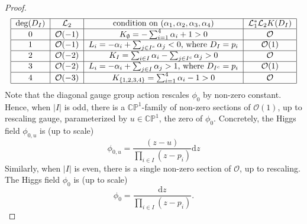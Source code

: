 \documentclass[12pt,letterpaper,reqno]{amsart}
\theoremstyle{remark}
\theoremstyle{definition}
\numberwithin{thm}{section}
\numberwithin{equation}{section}
\numberwithin{figure}{section}
\newcommand{\cL}{\ensuremath{\mathcal L}}
\newcommand{\cO}{\ensuremath{\mathcal O}}
\newcommand{\cE}{{\mathcal E}}
\newcommand{\de}{\mathrm{d}}
\begin{document}
\begin{proof}
\begin{equation}
\label{eq:tablefixedpoints}
        \begin{tabular}{|c|c|c|c|}\hline
                $\deg(D_I)$&$\cL_2$&condition on $(\alpha_1,\alpha_2,\alpha_3,\alpha_4)$& $\cL_1^* \cL_2 K(D_I)$\\\hline
                 $0$& $\cO(-1)$& $K_{\emptyset}= -\sum_{i=1}^4\alpha_i+1>0$&$\cO$ \\\hline 
                 $1$ &$\cO(-1)$& $L_i=-\alpha_i+\sum_{j\in I^c}\alpha_j<0$, where $D_I=p_i$& \cO(1)\\\hline
                 $2$ &$\cO(-2)$&$K_I = \sum_{i\in I}\alpha_i-\sum_{j\in I^c}\alpha_j>0$&$\cO$\\\hline
                 $3$&$\cO(-2)$& $L_i = -\alpha_i+\sum_{j\in I}\alpha_j>1$, where $D_{I^c}=p_i$&$\cO(1)$\\\hline
                 $4$&$\cO(-3)$& $K_{\{1,2,3,4\}}=\sum_{i=1}^4\alpha_i-1>0$&$\cO$\\\hline
        \end{tabular}
\end{equation}
Note that the diagonal gauge group action rescales $\phi_0$ by non-zero constant. Hence, when $|I|$ is odd, there is a $\mathbb{CP}^1$-family of non-zero sections of $\cO(1)$, up to rescaling gauge, parameterized by $u \in \mathbb{CP}^1$, the zero of $\phi_0$.
Concretely, 
the Higgs field $\phi_{0,u}$ is (up to scale) 
\begin{equation} \phi_{0,u} = \frac{(z-u)}{\prod_{i \in I} (z-p_i)} \de z %
\end{equation}
Similarly, when $|I|$ is even, there is a single non-zero section of $\cO$, up to rescaling. %
The Higgs field $\phi_0$ is (up to scale) 
\begin{equation} \label{eq:extfixed}
\phi_0 = \frac{\de z}{\prod_{i \in I} (z-p_i)} .%
\end{equation}

\end{proof}
\end{document}
